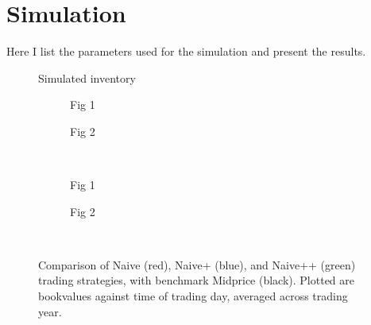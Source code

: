 \documentclass[12pt]{article}
\newlength\figureheight
\newlength\figurewidth
\begin{document}
\section*{Simulation}
Here I list the parameters used for the simulation and present the results.
\begin{figure}
  \centering
  \setlength{}
  \setlength{}
   
  \caption{Simulated inventory}
\label{fig:126b}
\end{figure}

\begin{figure}
\centering
\begin{subfigure}{.35\linewidth}
  \centering
  \setlength\figureheight{\linewidth} 
  \setlength\figurewidth{\linewidth}
  
  \caption{Fig 1}
\end{subfigure}%
\hfil%
\begin{subfigure}{.35\linewidth}
  \centering
  \setlength\figureheight{\linewidth}
  \setlength\figurewidth{\linewidth}
   
  \caption{Fig 2}
\end{subfigure}\\
\vspace{1cm}
\begin{subfigure}{.35\linewidth}
  \centering
  \setlength\figureheight{\linewidth} 
  \setlength\figurewidth{\linewidth}
  
  \caption{Fig 1}
\end{subfigure}%
\hfil%
\begin{subfigure}{.35\linewidth}
  \centering
  \setlength\figureheight{\linewidth}
  \setlength\figurewidth{\linewidth}
   
  \caption{Fig 2}
\end{subfigure}\\
\caption{Comparison of Naive (red), Naive+ (blue), and Naive++ (green) trading strategies, with benchmark Midprice (black). Plotted are bookvalues against time of trading day, averaged across trading year.}
\label{fig:127}
\end{figure}
\end{document}

